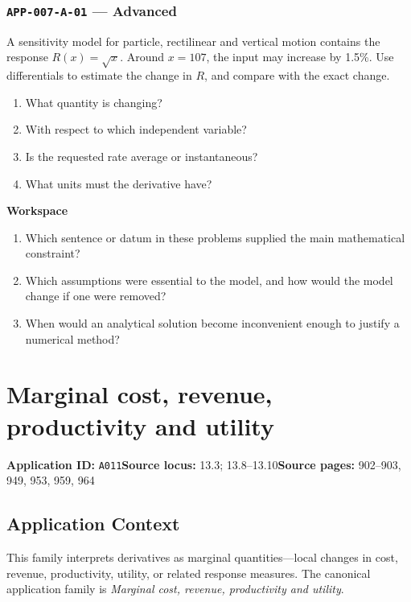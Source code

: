 \documentclass[11pt]{book}
\newcommand{\pid}[1]{\texttt{#1}}
\newcommand{\workspace}{\par\vspace{0.7in}\hrulefill\par\vspace{0.55in}\hrulefill\par}
\begin{document}
\subsection*{\pid{APP-007-A-01} — Advanced}
\begin{problembox}
A sensitivity model for particle, rectilinear and vertical motion contains the response $R(x)=\sqrt{x}$. Around $x=107$, the input may increase by 1.5\%. Use differentials to estimate the change in $R$, and compare with the exact change.
\end{problembox}
\begin{promptbox}\begin{enumerate}
\item What quantity is changing?
\item With respect to which independent variable?
\item Is the requested rate average or instantaneous?
\item What units must the derivative have?
\end{enumerate}\end{promptbox}
\textbf{Workspace}\workspace
\begin{reflectionbox}\begin{enumerate}
\item Which sentence or datum in these problems supplied the main mathematical constraint?
\item Which assumptions were essential to the model, and how would the model change if one were removed?
\item When would an analytical solution become inconvenient enough to justify a numerical method?
\end{enumerate}\end{reflectionbox}
\chapter{Marginal cost, revenue, productivity and utility}\label{app:A011}
\textbf{Application ID:} \pid{A011}\quad \textbf{Source locus:} 13.3; 13.8–13.10\quad \textbf{Source pages:} 902–903, 949, 953, 959, 964
\section*{Application Context}
This family interprets derivatives as marginal quantities—local changes in cost, revenue, productivity, utility, or related response measures. The canonical application family is \emph{Marginal cost, revenue, productivity and utility}.
\end{document}
